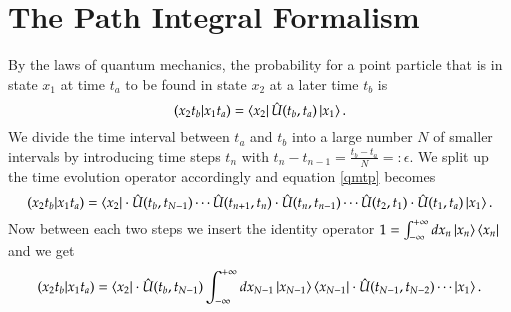 \section{The Path Integral Formalism}

By the laws of quantum mechanics, the probability for a point particle that is in state $x_1$ at time $t_a$ to be found in state $x_2$ at a later time $t_b$ is
\begin{equation} \label{qmtp}
  (x_2 t_b | x_1 t_a) = \bra{x_2}\hat{U}(t_b,t_a)\ket{x_1}.
\end{equation}
We divide the time interval between $t_a$ and $t_b$ into a large number $N$ of smaller intervals by introducing time steps $t_n$ with $t_n -t_{n-1} = \frac{t_b - t_a}{N} =:\epsilon$. We split up the time evolution operator accordingly and equation \ref{qmtp} becomes
\begin{equation} \label{qmtpn}
  (x_2 t_b | x_1 t_a) = \bra{x_2}\cdot\hat{U}(t_b,t_{N-1}) \cdots \hat{U}(t_{n+1},t_n)\cdot\hat{U}(t_n,t_{n-1}) \cdots \hat{U}(t_2,t_1)\cdot\hat{U}(t_1,t_a)\ket{x_1}.
\end{equation}
Now between each two steps we insert the identity operator $1 = \int_{-\infty}^{+\infty} dx_n \ket{x_n}\bra{x_n}$ and we get 
\begin{equation} \label{tpi}
  (x_2 t_b | x_1 t_a) = \bra{x_2}\cdot\hat{U}(t_b,t_{N-1}) \int_{-\infty}^{+\infty} dx_{N-1} \ket{x_{N-1}}\bra{x_{N-1}} \cdot \hat{U}(t_{N-1},t_{N-2}) \cdots \ket{x_1}.
\end{equation}
